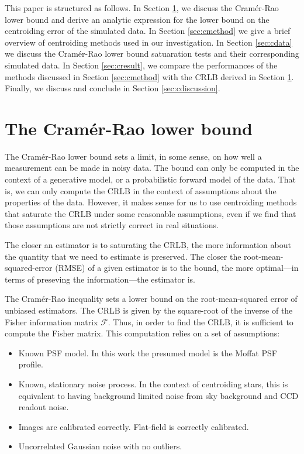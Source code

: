 This paper is structured as follows. In Section \ref{sec:cCRLB},
we discuss the Cram\'{e}r-Rao lower bound and derive
an analytic expression for the lower bound on the centroiding error
of the simulated data. 
In Section \ref{sec:cmethod} we give a brief overview of 
centroiding methods used in our investigation.
In Section \ref{sec:cdata} we discuss the Cram\'{e}r-Rao lower bound satuaration
tests and their corresponding simulated data.
In Section \ref{sec:cresult}, we compare the performances of the methods
discussed in Section \ref{sec:cmethod} with the CRLB derived in Section \ref{sec:cCRLB}. Finally, we discuss and conclude in Section \ref{sec:cdiscussion}.               
              

\section{The Cram\'{e}r-Rao lower bound}\label{sec:cCRLB}

The Cram\'{e}r-Rao lower bound sets a limit, in some sense, on how well a measurement 
can be made in noisy data.  The bound can only be computed in the context of a 
generative model, or a probabilistic forward model of the data. That is, we can 
only compute the CRLB in the context of assumptions about the properties of the data. 
However, it makes sense for us to use centroiding methods that saturate the CRLB under 
some reasonable assumptions, even if we find that those assumptions are not strictly correct in real situations.

The closer an estimator is to saturating the CRLB, the more information about the quantity that we 
need to estimate is preserved. The closer the root-mean-squared-error (RMSE) of a given estimator is to the bound,  
the more optimal---in terms of preseving the information---the estimator is. 

The Cram\'{e}r-Rao inequality \citep{crlb} sets a lower bound on the 
root-mean-squared error of unbiased estimators. The CRLB is given by the square-root of the inverse of 
the Fisher information matrix $\mathcal{F}$. Thus, in order to find the CRLB, it is sufficient to compute the Fisher matrix. 
This computation relies on a set of assumptions:

\begin{itemize}
  \item Known PSF model. In this work the presumed model is the Moffat PSF profile.
  \item Known, stationary noise process. In the context of centroiding stars, this is equivalent to 
        having background limited noise from sky background and CCD readout noise.
  \item Images are calibrated correctly. Flat-field is correctly calibrated.       
  \item Uncorrelated Gaussian noise with no outliers. 
\end{itemize}

